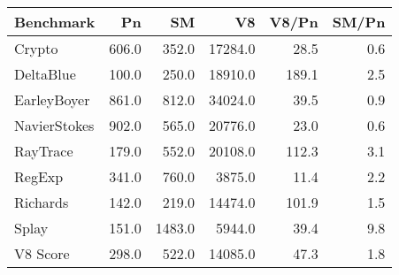 \begin{tabular}{|l|r|r|r|r|r|}
  \hline
  Benchmark & Pn & SM & V8 & V8/Pn & SM/Pn \\
  \hline \hline
  Crypto & 606.0 & 352.0 & 17284.0 & 28.5 & 0.6\\
  \hline
  DeltaBlue & 100.0 & 250.0 & 18910.0 & 189.1 & 2.5\\
  \hline
  EarleyBoyer & 861.0 & 812.0 & 34024.0 & 39.5 & 0.9\\
  \hline
  NavierStokes & 902.0 & 565.0 & 20776.0 & 23.0 & 0.6\\
  \hline
  RayTrace & 179.0 & 552.0 & 20108.0 & 112.3 & 3.1\\
  \hline
  RegExp & 341.0 & 760.0 & 3875.0 & 11.4 & 2.2\\
  \hline
  Richards & 142.0 & 219.0 & 14474.0 & 101.9 & 1.5\\
  \hline
  Splay & 151.0 & 1483.0 & 5944.0 & 39.4 & 9.8\\
  \hline
  \hline
  V8 Score & 298.0 & 522.0 & 14085.0 & 47.3 & 1.8\\
  \hline
\end{tabular}

